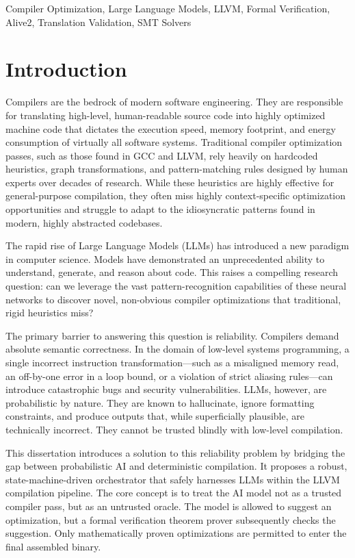 \documentclass[conference,10pt]{IEEEtran}
\begin{document}
\begin{IEEEkeywords}
Compiler Optimization, Large Language Models, LLVM, Formal Verification, Alive2, Translation Validation, SMT Solvers
\end{IEEEkeywords}

\section{Introduction}
Compilers are the bedrock of modern software engineering. They are responsible for translating high-level, human-readable source code into highly optimized machine code that dictates the execution speed, memory footprint, and energy consumption of virtually all software systems. Traditional compiler optimization passes, such as those found in GCC and LLVM, rely heavily on hardcoded heuristics, graph transformations, and pattern-matching rules designed by human experts over decades of research. While these heuristics are highly effective for general-purpose compilation, they often miss highly context-specific optimization opportunities and struggle to adapt to the idiosyncratic patterns found in modern, highly abstracted codebases.

The rapid rise of Large Language Models (LLMs) has introduced a new paradigm in computer science. Models have demonstrated an unprecedented ability to understand, generate, and reason about code. This raises a compelling research question: can we leverage the vast pattern-recognition capabilities of these neural networks to discover novel, non-obvious compiler optimizations that traditional, rigid heuristics miss?

The primary barrier to answering this question is reliability. Compilers demand absolute semantic correctness. In the domain of low-level systems programming, a single incorrect instruction transformation—such as a misaligned memory read, an off-by-one error in a loop bound, or a violation of strict aliasing rules—can introduce catastrophic bugs and security vulnerabilities. LLMs, however, are probabilistic by nature. They are known to hallucinate, ignore formatting constraints, and produce outputs that, while superficially plausible, are technically incorrect. They cannot be trusted blindly with low-level compilation.

This dissertation introduces a solution to this reliability problem by bridging the gap between probabilistic AI and deterministic compilation. It proposes a robust, state-machine-driven orchestrator that safely harnesses LLMs within the LLVM compilation pipeline. The core concept is to treat the AI model not as a trusted compiler pass, but as an untrusted oracle. The model is allowed to suggest an optimization, but a formal verification theorem prover subsequently checks the suggestion. Only mathematically proven optimizations are permitted to enter the final assembled binary. 
\end{document}
